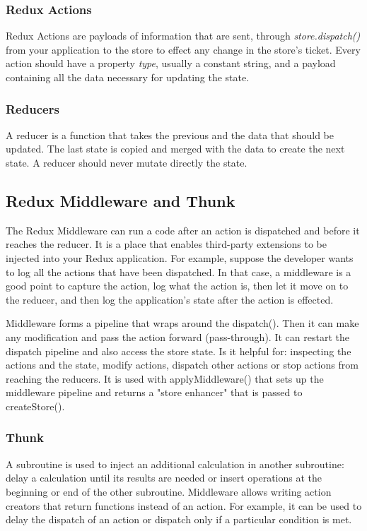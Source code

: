 \subsubsection*{Redux Actions}
Redux Actions are payloads of information that are sent, through \textit{store.dispatch()} from your application to the store to effect any change in the store's ticket. Every action should have a property \textit{type}, usually a constant string, and a payload containing all the data necessary for updating the state.

\subsubsection*{Reducers}
A reducer is a function that takes the previous and the data that should be updated. The last state is copied and merged with the data to create the next state. A reducer should never mutate directly the state.

\subsection*{Redux Middleware and Thunk}
The Redux Middleware can run a code after an action is dispatched and before it reaches the reducer. It is a place that enables third-party extensions to be injected into your Redux application. For example, suppose the developer wants to log all the actions that have been dispatched. In that case, a middleware is a good point to capture the action, log what the action is, then let it move on to the reducer, and then log the application's state after the action is effected.

Middleware forms a pipeline that wraps around the dispatch(). Then it can make any modification and pass the action forward (pass-through). It can restart the dispatch pipeline and also access the store state.
Is it helpful for: inspecting the actions and the state, modify actions, dispatch other actions or stop actions from reaching the reducers.
It is used with applyMiddleware() that sets up the middleware pipeline and returns a "store enhancer" that is passed to createStore().

\subsubsection*{Thunk}
A subroutine is used to inject an additional calculation in another subroutine: delay a calculation until its results are needed or insert operations at the beginning or end of the other subroutine.
Middleware allows writing action creators that return functions instead of an action. For example, it can be used to delay the dispatch of an action or dispatch only if a particular condition is met.


